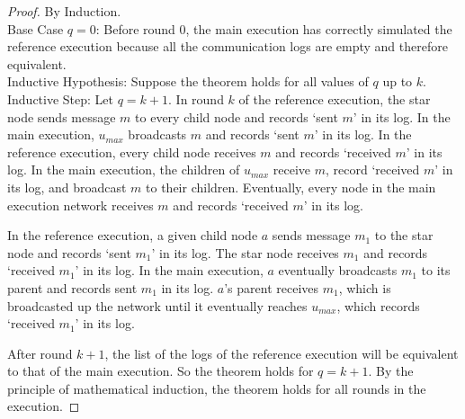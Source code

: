 \documentclass[english]{article}
\begin{document}
\begin{proof} By Induction. \\

\noindent Base Case $q=0$: Before round $0$, the main execution has correctly simulated the reference execution because all the communication logs are empty and therefore equivalent. \\

\noindent Inductive Hypothesis: Suppose the theorem holds for all values of $q$ up to $k$.\\

\noindent Inductive Step: Let $q=k+1$. 
In round $k$ of the reference execution, the star node sends message $m$ to every child node and records `sent $m$' in its log. In the main execution, $u_{max}$ broadcasts $m$ and records `sent $m$' in its log. In the reference execution, every child node receives $m$ and records `received $m$' in its log. In the main execution, the children of $u_{max}$ receive $m$, record `received $m$' in its log, and broadcast $m$ to their children. Eventually, every node in the main execution network receives $m$ and records `received $m$' in its log.

In the reference execution, a given child node $a$ sends message $m_1$ to the star node and records `sent $m_1$' in its log. The star node receives $m_1$ and records `received $m_1$' in its log. In the main execution, $a$ eventually broadcasts $m_1$ to its parent and records sent $m_1$ in its log. $a$'s parent receives $m_1$, which is broadcasted up the network until it eventually reaches $u_{max}$, which records `received $m_1$' in its log.

After round $k+1$, the list of the logs of the reference execution will be equivalent to that of the main execution. So the theorem holds for $q=k+1$. By the principle of mathematical induction, the theorem holds for all rounds in the execution.

\end{proof}
\end{document}
